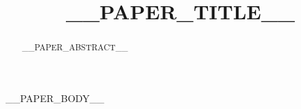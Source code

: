 \documentclass[twocolumn,english,superscriptaddress,nofootinbib]{revtex4-2}
\begin{document}
\title{__PAPER_TITLE__}

\begin{abstract}
__PAPER_ABSTRACT__
\end{abstract}

\maketitle

__PAPER_BODY__


\end{document}
